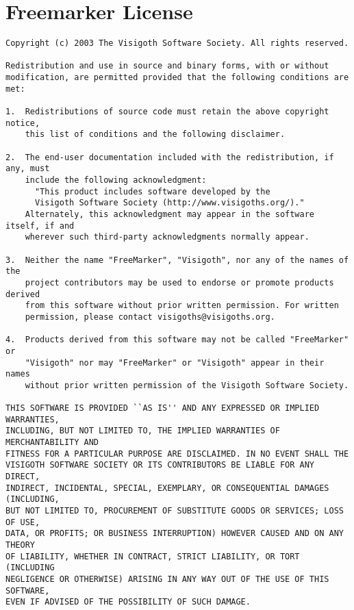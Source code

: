 \documentclass{InsightBook}
\begin{document}
\section{Freemarker License}
\begin{verbatim}
Copyright (c) 2003 The Visigoth Software Society. All rights reserved.

Redistribution and use in source and binary forms, with or without
modification, are permitted provided that the following conditions are met:

1.  Redistributions of source code must retain the above copyright notice,
    this list of conditions and the following disclaimer.

2.  The end-user documentation included with the redistribution, if any, must
    include the following acknowledgment:
      "This product includes software developed by the 
      Visigoth Software Society (http://www.visigoths.org/)."
    Alternately, this acknowledgment may appear in the software itself, if and
    wherever such third-party acknowledgments normally appear.

3.  Neither the name "FreeMarker", "Visigoth", nor any of the names of the
    project contributors may be used to endorse or promote products derived
    from this software without prior written permission. For written
    permission, please contact visigoths@visigoths.org.

4.  Products derived from this software may not be called "FreeMarker" or
    "Visigoth" nor may "FreeMarker" or "Visigoth" appear in their names
    without prior written permission of the Visigoth Software Society.

THIS SOFTWARE IS PROVIDED ``AS IS'' AND ANY EXPRESSED OR IMPLIED WARRANTIES,
INCLUDING, BUT NOT LIMITED TO, THE IMPLIED WARRANTIES OF MERCHANTABILITY AND
FITNESS FOR A PARTICULAR PURPOSE ARE DISCLAIMED. IN NO EVENT SHALL THE
VISIGOTH SOFTWARE SOCIETY OR ITS CONTRIBUTORS BE LIABLE FOR ANY DIRECT,
INDIRECT, INCIDENTAL, SPECIAL, EXEMPLARY, OR CONSEQUENTIAL DAMAGES (INCLUDING,
BUT NOT LIMITED TO, PROCUREMENT OF SUBSTITUTE GOODS OR SERVICES; LOSS OF USE,
DATA, OR PROFITS; OR BUSINESS INTERRUPTION) HOWEVER CAUSED AND ON ANY THEORY
OF LIABILITY, WHETHER IN CONTRACT, STRICT LIABILITY, OR TORT (INCLUDING
NEGLIGENCE OR OTHERWISE) ARISING IN ANY WAY OUT OF THE USE OF THIS SOFTWARE,
EVEN IF ADVISED OF THE POSSIBILITY OF SUCH DAMAGE.
\end{verbatim}
\end{document}
